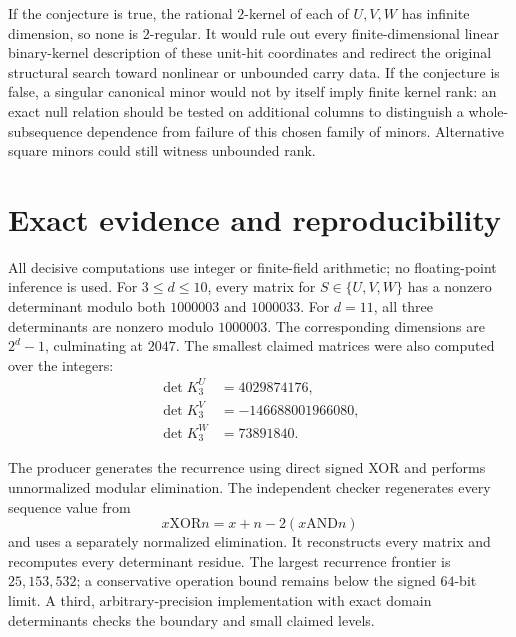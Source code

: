 \documentclass[11pt]{amsart}
\theoremstyle{definition}
\begin{document}
If the conjecture is true, the rational $2$-kernel of each of $U,V,W$ has
infinite dimension, so none is $2$-regular.  It would rule out every
finite-dimensional linear binary-kernel description of these unit-hit
coordinates and redirect the original structural search toward nonlinear or
unbounded carry data.  If the conjecture is false, a singular canonical minor
would not by itself imply finite kernel rank: an exact null relation should be
tested on additional columns to distinguish a whole-subsequence dependence
from failure of this chosen family of minors.  Alternative square minors
could still witness unbounded rank.

\section{Exact evidence and reproducibility}

All decisive computations use integer or finite-field arithmetic; no
floating-point inference is used.  For $3\leq d\leq10$, every matrix for
$S\in\{U,V,W\}$ has a nonzero determinant modulo both $1000003$ and
$1000033$.  For $d=11$, all three determinants are nonzero modulo $1000003$.
The corresponding dimensions are $2^d-1$, culminating at $2047$.  The
smallest claimed matrices were also computed over the integers:
\begin{align*}
 \det K_3^U&=4029874176,\\
 \det K_3^V&=-146688001966080,\\
 \det K_3^W&=73891840.
\end{align*}

The producer generates the recurrence using direct signed XOR and performs
unnormalized modular elimination.  The independent checker regenerates every
sequence value from
\[
 x\mathbin{\mathrm{XOR}}n=x+n-2(x\mathbin{\mathrm{AND}}n)
\]
and uses a separately normalized elimination.  It reconstructs every matrix
and recomputes every determinant residue.  The largest recurrence frontier is
$25{,}153{,}532$; a conservative operation bound remains below the signed
$64$-bit limit.  A third, arbitrary-precision implementation with exact
domain determinants checks the boundary and small claimed levels.
\end{document}
